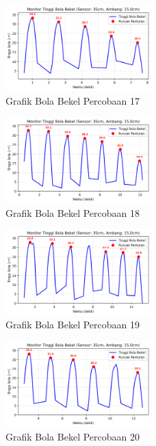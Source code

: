 \begin{figure}[htbp]
    \centering
    \includegraphics[width=0.5\textwidth]{chapters/DataPercobaan/Grafik_Bola_Bekel_17.png}
    \caption{Grafik Bola Bekel Percobaan 17}
\end{figure}
\begin{figure}[htbp]
    \centering
    \includegraphics[width=0.5\textwidth]{chapters/DataPercobaan/Grafik_Bola_Bekel_18.png}
    \caption{Grafik Bola Bekel Percobaan 18}
\end{figure}
\begin{figure}[htbp]
    \centering
    \includegraphics[width=0.5\textwidth]{chapters/DataPercobaan/Grafik_Bola_Bekel_19.png}
    \caption{Grafik Bola Bekel Percobaan 19}
\end{figure}
\begin{figure}[htbp]
    \centering
    \includegraphics[width=0.5\textwidth]{chapters/DataPercobaan/Grafik_Bola_Bekel_20.png}
    \caption{Grafik Bola Bekel Percobaan 20}
\end{figure}

